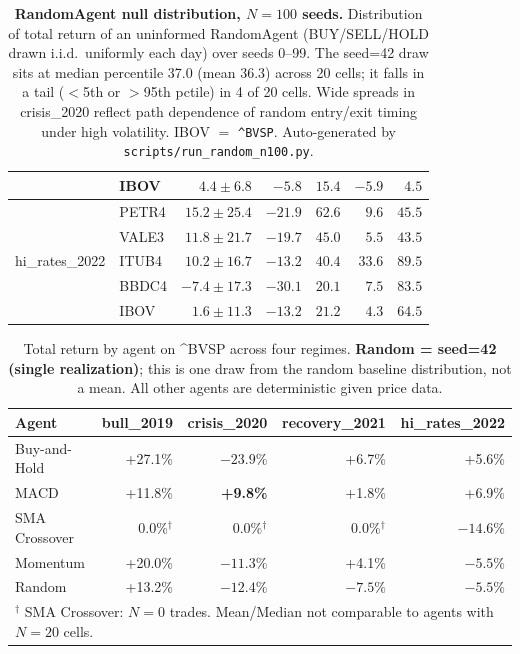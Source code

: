 \documentclass{article}
\begin{document}
\begin{table}[t]
\begin{tabular}{llrrrrr}
 & IBOV  & $4.4\pm6.8$   & $-5.8$  & $15.4$ & $-5.9$  & $4.5$ \\
\midrule
\multirow{5}{*}{hi\_rates\_2022} & PETR4 & $15.2\pm25.4$ & $-21.9$ & $62.6$ & $9.6$  & $45.5$ \\
 & VALE3 & $11.8\pm21.7$ & $-19.7$ & $45.0$ & $5.5$  & $43.5$ \\
 & ITUB4 & $10.2\pm16.7$ & $-13.2$ & $40.4$ & $33.6$ & $89.5$ \\
 & BBDC4 & $-7.4\pm17.3$ & $-30.1$ & $20.1$ & $7.5$  & $83.5$ \\
 & IBOV  & $1.6\pm11.3$  & $-13.2$ & $21.2$ & $4.3$  & $64.5$ \\
\bottomrule
\end{tabular}
\caption{\textbf{RandomAgent null distribution, $N{=}100$ seeds.}
  Distribution of total return of an uninformed RandomAgent (BUY/SELL/HOLD
  drawn i.i.d.\ uniformly each day) over seeds 0--99. The seed=42 draw
  sits at median percentile 37.0 (mean 36.3) across 20 cells; it falls
  in a tail ($<$5th or $>$95th pctile) in 4 of 20 cells.
  Wide spreads in crisis\_2020 reflect path dependence of random
  entry/exit timing under high volatility.
  IBOV $=$ \texttt{\^{}BVSP}. Auto-generated by
  \texttt{scripts/run\_random\_n100.py}.}
\label{tab:random-n100}
\end{table}

\begin{table}[h]
\centering
\caption{Total return by agent on \^{}BVSP across four regimes.
  \textbf{Random = seed=42 (single realization)}; this is one draw
  from the random baseline distribution, not a mean. All other agents
  are deterministic given price data.}
\label{tab:return_bvsp}
\begin{tabular}{lrrrr}
\toprule
\textbf{Agent} & \textbf{\footnotesize bull\_2019}
  & \textbf{\footnotesize crisis\_2020}
  & \textbf{\footnotesize recovery\_2021}
  & \textbf{\footnotesize hi\_rates\_2022} \\
\midrule
Buy-and-Hold  & +27.1\% & $-23.9\%$ & +6.7\%  & +5.6\%  \\
MACD          & +11.8\% & \textbf{+9.8\%} & +1.8\%  & +6.9\%  \\
SMA Crossover & 0.0\%$^\dag$ & 0.0\%$^\dag$ & 0.0\%$^\dag$ & $-14.6\%$ \\
Momentum      & +20.0\% & $-11.3\%$ & +4.1\%  & $-5.5\%$  \\
Random        & +13.2\% & $-12.4\%$ & $-7.5\%$ & $-5.5\%$  \\
\bottomrule
\multicolumn{5}{l}{\footnotesize $^\dag$ SMA Crossover: $N{=}0$ trades.
  Mean/Median not comparable to agents with $N{=}20$ cells.}
\end{tabular}
\end{table}
\end{document}

